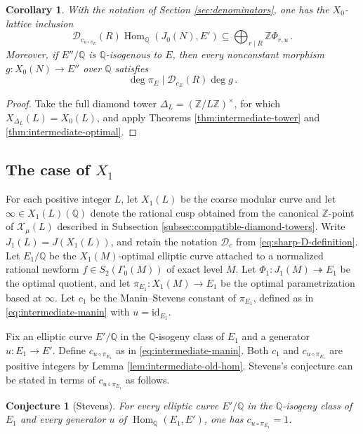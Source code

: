 \documentclass[12pt, letterpaper]{amsart}
\newtheorem{corollary}[theorem]{Corollary}
\newtheorem{conjecture}[theorem]{Conjecture}
\theoremstyle{definition}
\theoremstyle{remark}
\newcommand{\Q}{\mathbb Q}
\newcommand{\Z}{\mathbb Z}
\newcommand{\Hom}{\operatorname{Hom}}
\numberwithin{equation}{section}
\begin{document}
\begin{corollary}\label{cor:x0-sharp-specialization}
With the notation of Section \ref{sec:denominators}, one has the
\(X_0\)-lattice inclusion
\[
        \mathcal D_{c_{u\circ\pi_E}}(R)\Hom_\Q(J_0(N),E')
        \subseteq
        \bigoplus_{r\mid R}\Z\Phi_{r,u}\, .
\]
Moreover, if \(E''/\Q\) is \(\Q\)-isogenous to \(E\), then every nonconstant
morphism \(g:X_0(N)\to E''\) over \(\Q\) satisfies
\[
        \deg\pi_E\mid \mathcal D_{c_E}(R)\deg g\, .
\]
\end{corollary}

\begin{proof}
Take the full diamond tower \(\Delta_L=(\Z/L\Z)^\times\), for which
\(X_{\Delta_L}(L)=X_0(L)\), and apply Theorems
\ref{thm:intermediate-tower} and \ref{thm:intermediate-optimal}.
\end{proof}

\subsection{The case of \texorpdfstring{\(X_1\)}{X1}}

For each positive integer \(L\), let \(X_1(L)\) be the coarse modular curve and
let \(\infty\in X_1(L)(\Q)\) denote the rational cusp obtained from the canonical
\(\Z\)-point of \(\mathcal X_\mu(L)\) described in Subsection
\ref{subsec:compatible-diamond-towers}.
Write \(J_1(L)=J(X_1(L))\), and retain the notation \(\mathcal D_c\) from
\eqref{eq:sharp-D-definition}. Let \(E_1/\Q\) be the \(X_1(M)\)-optimal elliptic
curve attached to a normalized rational newform
\(f\in S_2(\Gamma_0(M))\) of exact level \(M\).
Let \(\Phi_1:J_1(M)\twoheadrightarrow E_1\) be the optimal quotient, and let
\(\pi_{E_1}:X_1(M)\to E_1\) be the optimal parametrization based at \(\infty\).
Let \(c_1\) be the Manin--Stevens constant of \(\pi_{E_1}\), defined as in
\eqref{eq:intermediate-manin} with \(u=\mathrm{id}_{E_1}\).

Fix an elliptic curve \(E'/\Q\) in the \(\Q\)-isogeny class of \(E_1\) and a
generator \(u:E_1\to E'\). Define \(c_{u\circ\pi_{E_1}}\) as in
\eqref{eq:intermediate-manin}. Both \(c_1\) and \(c_{u\circ\pi_{E_1}}\) are
positive integers by Lemma \ref{lem:intermediate-old-hom}.
Stevens's conjecture \cite[Conjecture I]{StevensStickelberger} can be stated
in terms of \(c_{u\circ\pi_{E_1}}\) as follows.

\begin{conjecture}[Stevens]
\label{conj:stevens-manin}
For every elliptic curve \(E'/\Q\) in the \(\Q\)-isogeny class of \(E_1\)
and every generator \(u\) of \(\Hom_\Q(E_1,E')\), one has
\(c_{u\circ\pi_{E_1}}=1\).
\end{conjecture}
\end{document}
